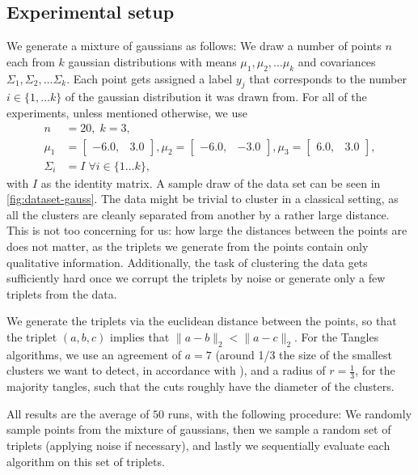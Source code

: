\subsection{Experimental setup}
We generate a mixture of gaussians as follows: We draw a number of points $n$ each from $k$ gaussian distributions with means $\mu_1, \mu_2, \ldots \mu_k$ and 
covariances $\Sigma_1, \Sigma_2, \ldots \Sigma_k$. Each point gets assigned a label $y_j$ that corresponds to the number $i \in \{1, \ldots k\}$ of the gaussian distribution it was drawn from.
For all of the experiments, unless mentioned otherwise, we use 
\begin{align*}
    n&=20,\; k=3, \\
    \mu_1 &= \begin{bmatrix} -6.0, & 3.0 \end{bmatrix}, \mu_2 = \begin{bmatrix} -6.0, & -3.0 \end{bmatrix},  \mu_3 = \begin{bmatrix} 6.0, & 3.0 \end{bmatrix}, \\
    \Sigma_i &= I \;\forall i \in \{ 1\ldots k\},
\end{align*}
with $I$ as the identity matrix. A sample draw of the data set can be seen in \autoref{fig:dataset-gauss}. The data might be trivial to cluster in a classical setting, as all the 
clusters are cleanly separated from another by a rather large distance. This is not too concerning for us: how large the distances between the points are does not matter, as 
the triplets we generate from the points contain only qualitative information. Additionally, the task of clustering the data gets sufficiently hard once we corrupt the triplets 
by noise or generate only a few triplets from the data.

We generate the triplets via the euclidean distance between the points, so that
the triplet $(a,b,c)$ implies that $\|a - b\|_2 < \|a - c\|_2$. For the Tangles algorithms, we use an agreement of $a=7$ (around 1/3 the size of the smallest
clusters we want to detect, in accordance with \cite{klepperClusteringTanglesAlgorithmic2021}), and a radius of $r=\frac{1}{3}$, for the majority
tangles, such that the cuts roughly have the diameter of the clusters.

All results are the average of $50$ runs, with the following procedure: We randomly sample points from the mixture of gaussians, then we sample a random set of triplets
(applying noise if necessary), and lastly we sequentially evaluate each algorithm on this set of triplets. 


